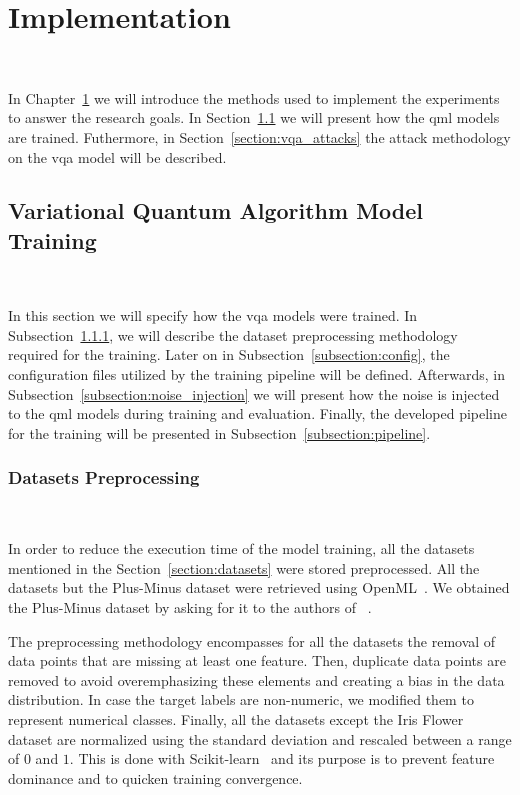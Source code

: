 \chapter{Implementation}\label{chapter:implementation} \

In Chapter~\ref{chapter:implementation} we will introduce
the methods used to implement the experiments to answer
the research goals. In Section~\ref{section:vqa_training}
we will present how the \ac{qml} models are trained.
Futhermore, in Section~\ref{section:vqa_attacks} the
attack methodology on the \ac{vqa} model will be described. \

\section{Variational Quantum Algorithm Model Training}\label{section:vqa_training} \

In this section we will specify how the \ac{vqa} models
were trained. In Subsection~\ref{subsection:preprocess},
we will describe the dataset preprocessing methodology required
for the training. Later on in Subsection~\ref{subsection:config},
the configuration files utilized by the training pipeline will
be defined. Afterwards, in Subsection~\ref{subsection:noise_injection}
we will present how the noise is injected to the
\ac{qml} models during training and evaluation.
Finally, the developed pipeline for the training will
be presented in Subsection~\ref{subsection:pipeline}. \

\subsection{Datasets Preprocessing}\label{subsection:preprocess} \

In order to reduce the execution time of the model training, all the
datasets mentioned in the Section~\ref{section:datasets} were
stored preprocessed. All the datasets but the Plus-Minus dataset
were retrieved using OpenML~\cite{vanschoren_openml_2014}. We
obtained the Plus-Minus dataset by asking for it to the authors of 
~\cite{wendlinger_comparative_2024}. \

The preprocessing methodology encompasses for all the datasets the
removal of data points that are missing at least one feature.
Then, duplicate data points are removed to avoid overemphasizing
these elements and creating a bias in the data distribution. In
case the target labels are non-numeric, we modified them to
represent numerical classes. Finally, all the datasets except
the Iris Flower dataset are normalized using the standard
deviation and rescaled between a range of \(0\) and \(1\). This
is done with Scikit-learn~\cite{pedregosa_scikit-learn_2011}
and its purpose is to prevent feature dominance and to quicken
training convergence. \

